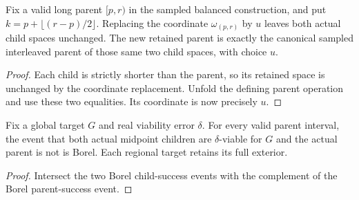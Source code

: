 \begin{lemma}
    \label{lem:canonical_interval_sampling_parent_section}
    \leanok
    Fix a valid long parent $[p,r)$ in the sampled balanced construction,
    and put $k=p+\lfloor(r-p)/2\rfloor$. Replacing the coordinate
    $\omega_{(p,r)}$ by $u$ leaves both actual child spaces unchanged.
    The new retained parent is exactly the canonical sampled interleaved
    parent of those same two child spaces, with choice $u$.
\end{lemma}
\begin{proof}\leanok
    Each child is strictly shorter than the parent, so its retained space
    is unchanged by the coordinate replacement. Unfold the defining
    parent operation and use these two equalities. Its coordinate is now
    precisely $u$.
\end{proof}

\begin{lemma}
    \label{lem:borel_guarded_canonical_interval_failure}
    \leanok
    Fix a global target $G$ and real viability error $\delta$. For every
    valid parent interval, the event that both actual midpoint children
    are $\delta$-viable for $G$ and the actual parent is not is Borel.
    Each regional target retains its full exterior.
\end{lemma}
\begin{proof}\leanok
    Intersect the two Borel child-success events with the complement of
    the Borel parent-success event.
\end{proof}


